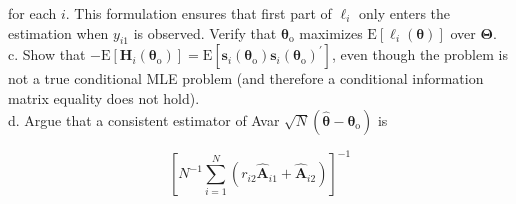 \documentclass[10pt]{article}
\begin{document}
for each $i$. This formulation ensures that first part of $\ell_{i}$ only enters the estimation when $y_{i 1}$ is observed. Verify that $\boldsymbol{\theta}_{\mathrm{o}}$ maximizes $\mathrm{E}\left[\ell_{i}(\boldsymbol{\theta})\right]$ over $\boldsymbol{\Theta}$.\\
c. Show that $-\mathrm{E}\left[\mathbf{H}_{i}\left(\boldsymbol{\theta}_{\mathrm{o}}\right)\right]=\mathrm{E}\left[\mathbf{s}_{i}\left(\boldsymbol{\theta}_{\mathrm{o}}\right) \mathbf{s}_{i}\left(\boldsymbol{\theta}_{\mathrm{o}}\right)^{\prime}\right]$, even though the problem is not a true conditional MLE problem (and therefore a conditional information matrix equality does not hold).\\
d. Argue that a consistent estimator of Avar $\sqrt{N}\left(\hat{\boldsymbol{\theta}}-\boldsymbol{\theta}_{\mathrm{o}}\right)$ is

$$
\left[N^{-1} \sum_{i=1}^{N}\left(r_{i 2} \hat{\mathbf{A}}_{i 1}+\hat{\mathbf{A}}_{i 2}\right)\right]^{-1}
$$
\end{document}
